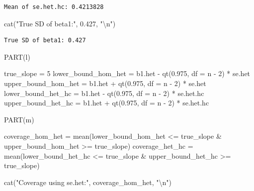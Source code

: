 \documentclass[
  11pt,
]{article}
\newenvironment{Shaded}{\begin{snugshade}}{\end{snugshade}}
\newcommand{\AttributeTok}[1]{\textcolor[rgb]{0.40,0.45,0.13}{#1}}
\newcommand{\DecValTok}[1]{\textcolor[rgb]{0.68,0.00,0.00}{#1}}
\newcommand{\FloatTok}[1]{\textcolor[rgb]{0.68,0.00,0.00}{#1}}
\newcommand{\FunctionTok}[1]{\textcolor[rgb]{0.28,0.35,0.67}{#1}}
\newcommand{\NormalTok}[1]{\textcolor[rgb]{0.00,0.23,0.31}{#1}}
\newcommand{\OtherTok}[1]{\textcolor[rgb]{0.00,0.23,0.31}{#1}}
\newcommand{\SpecialCharTok}[1]{\textcolor[rgb]{0.37,0.37,0.37}{#1}}
\newcommand{\StringTok}[1]{\textcolor[rgb]{0.13,0.47,0.30}{#1}}
\begin{document}
\begin{verbatim}
Mean of se.het.hc: 0.4213828 
\end{verbatim}

\begin{Shaded}
\begin{Highlighting}[]
\FunctionTok{cat}\NormalTok{(}\StringTok{"True SD of beta1:"}\NormalTok{, }\FloatTok{0.427}\NormalTok{, }\StringTok{"}\SpecialCharTok{\textbackslash{}n}\StringTok{"}\NormalTok{)}
\end{Highlighting}
\end{Shaded}

\begin{verbatim}
True SD of beta1: 0.427 
\end{verbatim}

PART(l)

\begin{Shaded}
\begin{Highlighting}[]
\NormalTok{true\_slope }\OtherTok{=} \DecValTok{5}
\NormalTok{lower\_bound\_hom\_het }\OtherTok{=}\NormalTok{ b1.het }\SpecialCharTok{{-}} \FunctionTok{qt}\NormalTok{(}\FloatTok{0.975}\NormalTok{, }\AttributeTok{df =}\NormalTok{ n }\SpecialCharTok{{-}} \DecValTok{2}\NormalTok{) }\SpecialCharTok{*}\NormalTok{ se.het}
\NormalTok{upper\_bound\_hom\_het }\OtherTok{=}\NormalTok{ b1.het }\SpecialCharTok{+} \FunctionTok{qt}\NormalTok{(}\FloatTok{0.975}\NormalTok{, }\AttributeTok{df =}\NormalTok{ n }\SpecialCharTok{{-}} \DecValTok{2}\NormalTok{) }\SpecialCharTok{*}\NormalTok{ se.het}
\NormalTok{lower\_bound\_het\_hc }\OtherTok{=}\NormalTok{ b1.het }\SpecialCharTok{{-}} \FunctionTok{qt}\NormalTok{(}\FloatTok{0.975}\NormalTok{, }\AttributeTok{df =}\NormalTok{ n }\SpecialCharTok{{-}} \DecValTok{2}\NormalTok{) }\SpecialCharTok{*}\NormalTok{ se.het.hc}
\NormalTok{upper\_bound\_het\_hc }\OtherTok{=}\NormalTok{ b1.het }\SpecialCharTok{+} \FunctionTok{qt}\NormalTok{(}\FloatTok{0.975}\NormalTok{, }\AttributeTok{df =}\NormalTok{ n }\SpecialCharTok{{-}} \DecValTok{2}\NormalTok{) }\SpecialCharTok{*}\NormalTok{ se.het.hc}
\end{Highlighting}
\end{Shaded}

PART(m)

\begin{Shaded}
\begin{Highlighting}[]
\NormalTok{coverage\_hom\_het }\OtherTok{=} \FunctionTok{mean}\NormalTok{(lower\_bound\_hom\_het }\SpecialCharTok{\textless{}=}\NormalTok{ true\_slope }\SpecialCharTok{\&} 
\NormalTok{                          upper\_bound\_hom\_het }\SpecialCharTok{\textgreater{}=}\NormalTok{ true\_slope)}
\NormalTok{coverage\_het\_hc }\OtherTok{=} \FunctionTok{mean}\NormalTok{(lower\_bound\_het\_hc }\SpecialCharTok{\textless{}=}\NormalTok{ true\_slope }\SpecialCharTok{\&} 
\NormalTok{                         upper\_bound\_het\_hc }\SpecialCharTok{\textgreater{}=}\NormalTok{ true\_slope)}

\FunctionTok{cat}\NormalTok{(}\StringTok{"Coverage using se.het:"}\NormalTok{, coverage\_hom\_het, }\StringTok{"}\SpecialCharTok{\textbackslash{}n}\StringTok{"}\NormalTok{)}
\end{Highlighting}
\end{Shaded}
\end{document}
